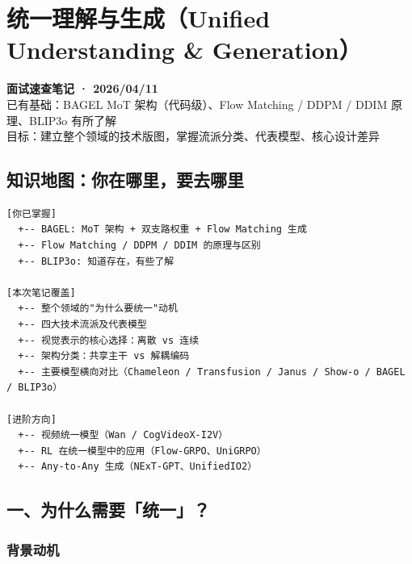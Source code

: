 
\section{统一理解与生成（Unified Understanding \& Generation）}

\begin{conceptbox}
\textbf{面试速查笔记 · 2026/04/11}\\
已有基础：BAGEL MoT 架构（代码级）、Flow Matching / DDPM / DDIM 原理、BLIP3o 有所了解\\
目标：建立整个领域的技术版图，掌握流派分类、代表模型、核心设计差异
\end{conceptbox}

\subsection{\textbf{知识地图}：你在哪里，要去哪里}

\begin{lstlisting}
[你已掌握]
  +-- BAGEL: MoT 架构 + 双支路权重 + Flow Matching 生成
  +-- Flow Matching / DDPM / DDIM 的原理与区别
  +-- BLIP3o: 知道存在，有些了解

[本次笔记覆盖]
  +-- 整个领域的"为什么要统一"动机
  +-- 四大技术流派及代表模型
  +-- 视觉表示的核心选择：离散 vs 连续
  +-- 架构分类：共享主干 vs 解耦编码
  +-- 主要模型横向对比（Chameleon / Transfusion / Janus / Show-o / BAGEL / BLIP3o）

[进阶方向]
  +-- 视频统一模型（Wan / CogVideoX-I2V）
  +-- RL 在统一模型中的应用（Flow-GRPO、UniGRPO）
  +-- Any-to-Any 生成（NExT-GPT、UnifiedIO2）
\end{lstlisting}

\subsection{一、为什么需要「统一」？}

\subsubsection{背景动机}

